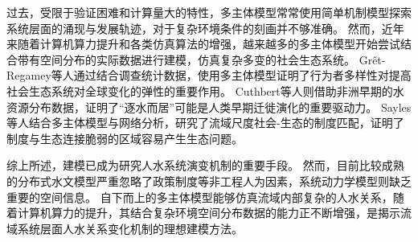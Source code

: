 过去，受限于验证困难和计算量大的特性，多主体模型常常使用简单机制模型探索系统层面的涌现与发展轨迹，对于复杂环境条件的刻画并不够准确\cite{biggs2021}。
然而，近年来随着计算机算力提升和各类仿真算法的增强，越来越多的多主体模型开始尝试结合带有空间分布的实际数据进行建模，仿真复杂多变的社会\textendash{}生态系统\cite{steger2021}。
Grêt-Regamey等人通过结合调查统计数据，使用多主体模型证明了行为者多样性对提高社会\textendash{}生态系统对全球变化的弹性的重要作用\cite{gret-regamey2019}。
Cuthbert等人则借助非洲早期的水资源分布数据，证明了“逐水而居”可能是人类早期迁徙演化的重要驱动力\cite{cuthbert2017}。
Sayles等人结合多主体模型与网络分析，研究了流域尺度社会-生态的制度匹配，证明了制度与生态连接脆弱的区域容易产生生态问题\cite{sayles2017}。

综上所述，建模已成为研究人水系统演变机制的重要手段。
然而，目前比较成熟的分布式水文模型严重忽略了政策制度等非工程人为因素，系统动力学模型则缺乏重要的空间信息。
自下而上的多主体模型能够仿真流域内部复杂的人\textendash{}水关系，随着计算机算力的提升，其结合复杂环境空间分布数据的能力正不断增强，是揭示流域系统层面人\textendash{}水关系变化机制的理想建模方法。
